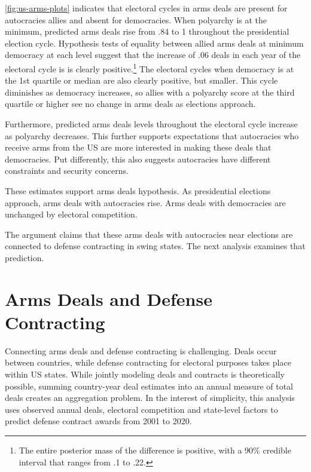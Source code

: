 \documentclass[12pt]{article}
\begin{document}
\autoref{fig:us-arms-plots} indicates that electoral cycles in arms deals are present for autocracies allies and absent for democracies.
When polyarchy is at the minimum, predicted arms deals rise from .84 to 1 throughout the presidential election cycle.
Hypothesis tests of equality between allied arms deals at minimum democracy at each level suggest that the increase of .06 deals in each year of the electoral cycle is is clearly positive.\footnote{The entire posterior mass of the difference is positive, with a 90\% credible interval that ranges from .1 to .22.}
The electoral cycles when democracy is at the 1st quartile or median are also clearly positive, but smaller.
This cycle diminishes as democracy increases, so allies with a polyarchy score at the third quartile or higher see no change in arms deals as elections approach.  


Furthermore, predicted arms deals levels throughout the electoral cycle increase as polyarchy decreases. 
This further supports expectations that autocracies who receive arms from the US are more interested in making these deals that democracies. 
Put differently, this also suggests autocracies have different constraints and security concerns. 


These estimates support arms deals hypothesis. 
As presidential elections approach, arms deals with autocracies rise. 
Arms deals with democracies are unchanged by electoral competition.


The argument claims that these arms deals with autocracies near elections are connected to defense contracting in swing states. 
The next analysis examines that prediction. 


\section{Arms Deals and Defense Contracting}


Connecting arms deals and defense contracting is challenging. 
Deals occur between countries, while defense contracting for electoral purposes takes place within US states.
While jointly modeling deals and contracts is theoretically possible, summing country-year deal estimates into an annual measure of total deals creates an aggregation problem. %
In the interest of simplicity, this analysis uses observed annual deals, electoral competition and state-level factors to predict defense contract awards from 2001 to 2020. 
\end{document}
